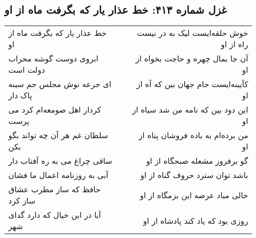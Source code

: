 \begin{center}
\section*{غزل شماره ۴۱۳: خط عذار یار که بگرفت ماه از او}
\label{sec:sh413}
\begin{longtable}{l p{0.5cm} r}
خط عذار یار که بگرفت ماه از او
&&
خوش حلقه‌ایست لیک به در نیست راه از او
\\
ابروی دوست گوشه محراب دولت است
&&
آن جا بمال چهره و حاجت بخواه از او
\\
ای جرعه نوش مجلس جم سینه پاک دار
&&
کآیینه‌ایست جام جهان بین که آه از او
\\
کردار اهل صومعه‌ام کرد می پرست
&&
این دود بین که نامه من شد سیاه از او
\\
سلطان غم هر آن چه تواند بگو بکن
&&
من برده‌ام به باده فروشان پناه از او
\\
ساقی چراغ می به ره آفتاب دار
&&
گو برفروز مشعله صبحگاه از او
\\
آبی به روزنامه اعمال ما فشان
&&
باشد توان سترد حروف گناه از او
\\
حافظ که ساز مطرب عشاق ساز کرد
&&
خالی مباد عرصه این بزمگاه از او
\\
آیا در این خیال که دارد گدای شهر
&&
روزی بود که یاد کند پادشاه از او
\\
\end{longtable}
\end{center}
